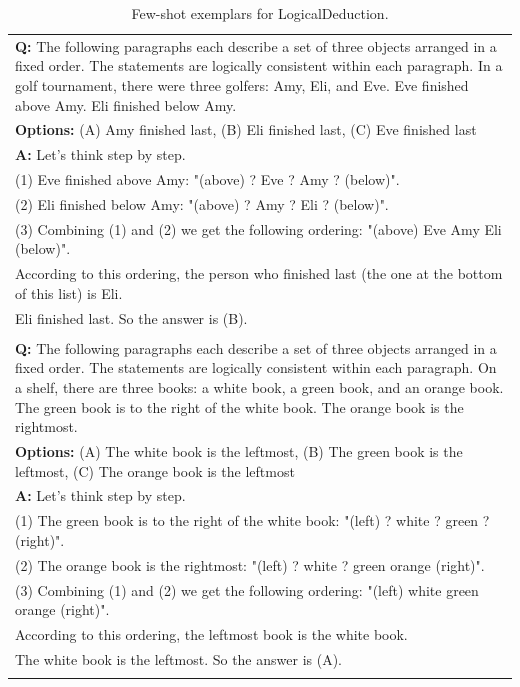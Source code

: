 \begin{table}[H]
    \caption{Few-shot exemplars for LogicalDeduction.}
    \label{tab:logicaldeduction}
    \centering
    \begin{tabularx}{\columnwidth}{@{}X@{}}
        \toprule
        \textbf{Q:} The following paragraphs each describe a set of three objects arranged in a fixed order. The statements are logically consistent within each paragraph. In a golf tournament, there were three golfers: Amy, Eli, and Eve. Eve finished above Amy. Eli finished below Amy. \\
        \textbf{Options:} (A) Amy finished last, (B) Eli finished last, (C) Eve finished last \\
        \textbf{A:} Let's think step by step. \\
        (1) Eve finished above Amy: "(above) ? Eve ? Amy ? (below)". \\
        (2) Eli finished below Amy: "(above) ? Amy ? Eli ? (below)". \\
        (3) Combining (1) and (2) we get the following ordering: "(above) Eve Amy Eli (below)". \\
        According to this ordering, the person who finished last (the one at the bottom of this list) is Eli. \\
        Eli finished last. So the answer is (B). \\ \\
        
        \textbf{Q:} The following paragraphs each describe a set of three objects arranged in a fixed order. The statements are logically consistent within each paragraph. On a shelf, there are three books: a white book, a green book, and an orange book. The green book is to the right of the white book. The orange book is the rightmost. \\
        \textbf{Options:} (A) The white book is the leftmost, (B) The green book is the leftmost, (C) The orange book is the leftmost \\
        \textbf{A:} Let's think step by step. \\
        (1) The green book is to the right of the white book: "(left) ? white ? green ? (right)". \\
        (2) The orange book is the rightmost: "(left) ? white ? green orange (right)". \\
        (3) Combining (1) and (2) we get the following ordering: "(left) white green orange (right)". \\
        According to this ordering, the leftmost book is the white book. \\
        The white book is the leftmost. So the answer is (A). \\ \\
        

\end{tabularx}
\end{table}
